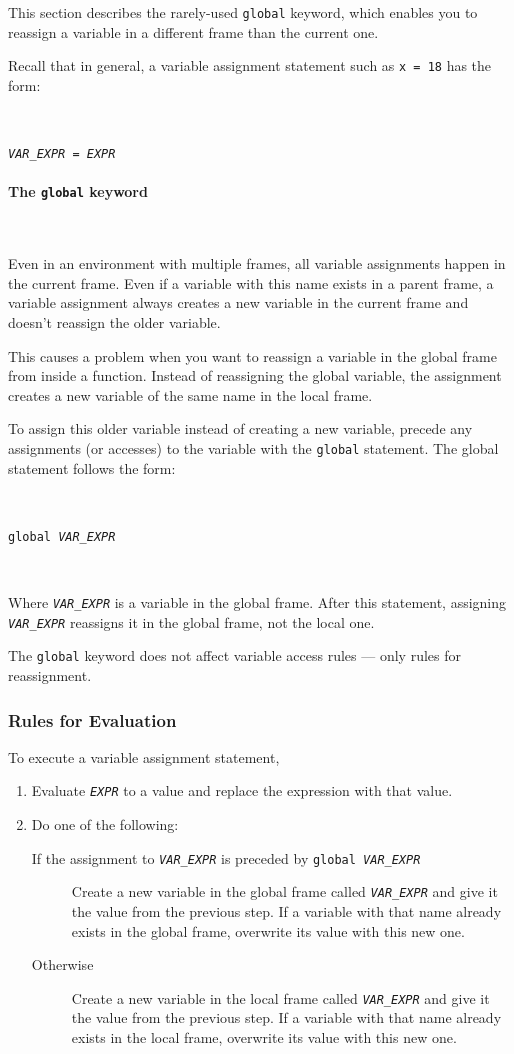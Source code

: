 \documentclass{article}
\newcommand{\expr}[1]{\texttt{#1}}
\newcommand{\kw}[1]{\expr{#1}}
\newcommand{\mvar}[1]{\expr{\emph{\uppercase{#1}}}}
\newcommand{\myparagraph}[1]{\paragraph{#1} \ifhevea\else \strut \\ \strut \fi}
\newcommand{\pretabularspace}{\ifhevea\else \strut \\ \strut \fi}
\newcommand{\posttabularspace}{\ifhevea\else \strut \\ \strut \fi}
\begin{document}
This section describes the rarely-used \kw{global} keyword, which enables
you to reassign a variable in a different frame than the current one.

  Recall that in general, a variable assignment statement such as \expr{x = 18} has the form:

  \pretabularspace
  \expr{\mvar{VAR\_EXPR} = \mvar{EXPR}}

  \myparagraph{The \kw{global} keyword}
  Even in an environment with multiple frames, all variable assignments
  happen in the current frame.  Even if a variable with this name exists in
  a parent frame, a variable assignment always creates a new variable in
  the current frame and doesn't reassign the older variable.

This causes a problem when you want to reassign a variable in the global
frame from inside a function.  Instead of reassigning the global variable,
the assignment creates a new variable of the same name in the local frame.

  To assign this older variable instead of creating a new variable, precede any assignments (or accesses) to the variable with the \kw{global} statement. The global statement follows the form:

  \pretabularspace
  \expr{global \mvar{VAR\_EXPR}}
  \posttabularspace

  Where \mvar{VAR\_EXPR} is a variable in the global frame. After this statement, assigning \mvar{VAR\_EXPR} reassigns it in the global frame, not the local one.

The \kw{global} keyword does not affect variable access rules --- only
rules for reassignment.


\subsubsection{Rules for Evaluation}

  To execute a variable assignment statement,

  \begin{enumerate}

    \item
    Evaluate \mvar{EXPR} to a value and replace the expression with that value.

    \item
    Do one of the following:
    \begin{description}
      \item[If the assignment to \mvar{var\_expr} is preceded by \expr{global \mvar{var\_expr}}] Create a new variable in the global frame called \mvar{VAR\_EXPR} and give it the value from the previous step. If a variable with that name already exists in the global frame, overwrite its value with this new one.
      \item[Otherwise] Create a new variable in the local frame called \mvar{VAR\_EXPR} and give it the value from the previous step. If a variable with that name already exists in the local frame, overwrite its value with this new one.
    \end{description}
  \end{enumerate}
\end{document}
